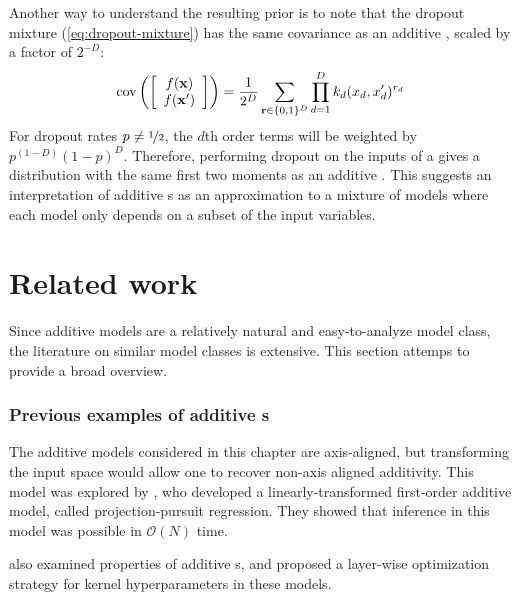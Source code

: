 Another way to understand the resulting prior is to note that the dropout mixture (\cref{eq:dropout-mixture}) has the same covariance as an additive \gp{}, scaled by a factor of $2^{-D}$:
\begin{align}
\operatorname{cov}\left( \left[ \begin{array}{c} {f({\bf{x}})} \\ {f({\bf{x}}')} \end{array} \right] \right) = \frac{1}{2^{D}} \sum_{{\bf{r}} \in \{0,1\}^D}  \prod_{d=1}^D k_d(x_d, x_d')^{r_d}
\label{eq:dropout-mixture-covariance}
\end{align}
%
For dropout rates $p \neq \nicefrac{1}{2}$, the $d$th order terms will be weighted by $p^{(1-D)}(1-p)^D$.
Therefore, performing dropout on the inputs of a \gp{} gives a distribution with the same first two moments as an additive \gp{}.
This suggests an interpretation of additive \gp{}s as an approximation to a mixture of models where each model only depends on a subset of the input variables.






\section{Related work}

Since additive models are a relatively natural and easy-to-analyze model class, the literature on similar model classes is extensive.
This section attemps to provide a broad overview.

\subsubsection{Previous examples of additive \sgp{}s}

The additive models considered in this chapter are axis-aligned, but transforming the input space would allow one to recover non-axis aligned additivity.
This model was explored by \citet{gilboa2013scaling}, who developed a linearly-transformed first-order additive \gp{} model, called projection-pursuit \gp{} regression.
They showed that inference in this model was possible in $\mathcal{O}(N)$ time.

\citet{durrande2011additive} also examined properties of additive \gp{}s, and proposed a layer-wise optimization strategy for kernel hyperparameters in these models.

